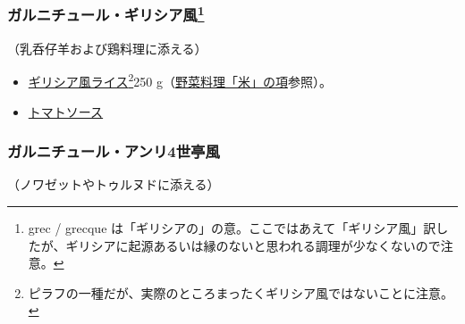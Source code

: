 \begin{recette}
\hypertarget{garniture-a-la-grecque}{%
\subsubsection[ガルニチュール・ギリシア風]{\texorpdfstring{ガルニチュール・ギリシア風\footnote{grec
  / grecque
  は「ギリシアの」の意。ここではあえて「ギリシア風」訳したが、ギリシアに起源あるいは縁のないと思われる調理が少なくないので注意。}}{ガルニチュール・ギリシア風}}\label{garniture-a-la-grecque}}



（乳呑仔羊および鶏料理に添える）

\begin{itemize}
\item
  \protect\hyperlink{riz-a-la-grecque}{ギリシア風ライス}\footnote{ピラフの一種だが、実際のところまったくギリシア風ではないことに注意。}250
  g（\protect\hyperlink{riz}{野菜料理「米」の項}参照）。
\item
  \protect\hyperlink{sauce-tomate}{トマトソース}
\end{itemize}

\hypertarget{garniture-henri-iv}{%
\subsubsection{ガルニチュール・アンリ4世亭風}\label{garniture-henri-iv}}



（ノワゼットやトゥルヌドに添える）


\end{recette}
